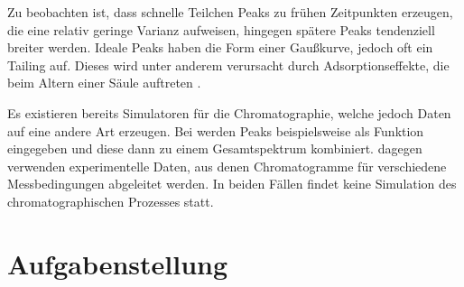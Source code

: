 \documentclass[a4paper,10pt]{article}
\begin{document}


Zu beobachten ist, dass schnelle Teilchen Peaks zu frühen Zeitpunkten erzeugen, die eine relativ geringe Varianz aufweisen, hingegen spätere Peaks tendenziell breiter werden. Ideale Peaks haben die Form einer Gaußkurve, jedoch oft ein Tailing auf. Dieses wird unter anderem verursacht durch Adsorptionseffekte, die beim Altern einer Säule auftreten \cite{kolb2003}.%

Es existieren bereits Simulatoren für die Chromatographie, welche jedoch Daten auf eine andere Art erzeugen. Bei \cite{spreadsheet} werden Peaks beispielsweise als Funktion eingegeben und diese dann zu einem Gesamtspektrum kombiniert. \cite{hplcsim} dagegen verwenden experimentelle Daten, aus denen Chromatogramme für verschiedene Messbedingungen abgeleitet werden. In beiden Fällen findet keine Simulation des chromatographischen Prozesses statt.


\section{Aufgabenstellung}
\end{document}
